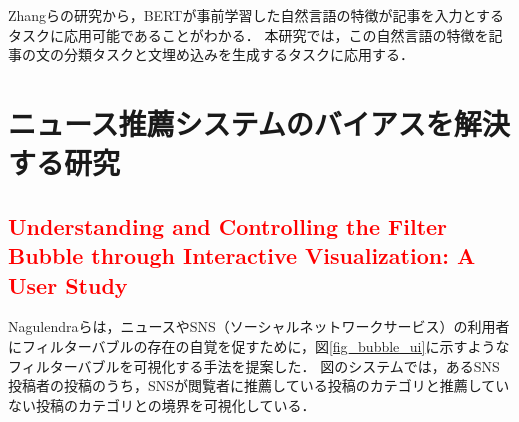 \documentclass[12pt,a4j]{jreport}
\begin{document}
Zhangらの研究から，BERTが事前学習した自然言語の特徴が記事を入力とするタスクに応用可能であることがわかる．
本研究では，この自然言語の特徴を記事の文の分類タスクと文埋め込みを生成するタスクに応用する．





\section{ニュース推薦システムのバイアスを解決する研究}

\subsection{\textcolor{red}{Understanding and Controlling the Filter Bubble through Interactive Visualization: A User Study}}
Nagulendraらは，ニュースやSNS（ソーシャルネットワークサービス）の利用者にフィルターバブルの存在の自覚を促すために，図\ref{fig_bubble_ui}に示すようなフィルターバブルを可視化する手法を提案した\cite{nagulendra_understanding_2014}．
図のシステムでは，あるSNS投稿者の投稿のうち，SNSが閲覧者に推薦している投稿のカテゴリと推薦していない投稿のカテゴリとの境界を可視化している．
\end{document}
